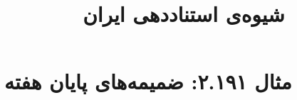 \documentclass[a4paper,10pt]{article}
\begin{document}
\title{شیوه‌ی استناددهی ایران
 }
\author{}
\date{}
\maketitle



\section*{مثال ۲.۱۹۱: ضمیمه‌های پایان هفته}

\cite{نیکوفر1385}\\
\cite{barcott2000}\\






\end{document}
